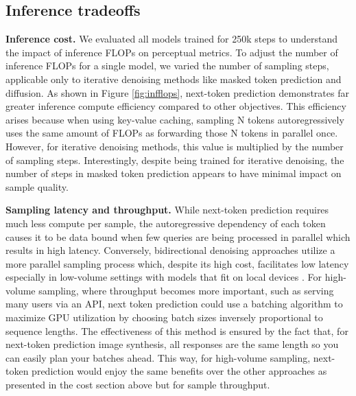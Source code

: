 \mainres
\fintl

\subsection{Inference tradeoffs}
\label{sec:results:inference}
\textbf{Inference cost.} We evaluated all models trained for 250k steps to understand the impact of inference FLOPs on perceptual metrics. To adjust the number of inference FLOPs for a single model, we varied the number of sampling steps, applicable only to iterative denoising methods like masked token prediction and diffusion. As shown in Figure \ref{fig:infflops}, next-token prediction demonstrates far greater inference compute efficiency compared to other objectives. This efficiency arises because when using key-value caching, sampling N tokens autoregressively uses the same amount of FLOPs as forwarding those N tokens in parallel once. However, for iterative denoising methods, this value is multiplied by the number of sampling steps. Interestingly, despite being trained for iterative denoising, the number of steps in masked token prediction appears to have minimal impact on sample quality.

\infflops

\textbf{Sampling latency and throughput.} While next-token prediction requires much less compute per sample, the autoregressive dependency of each token causes it to be data bound when few queries are being processed in parallel which results in high latency. Conversely, bidirectional denoising approaches utilize a more parallel sampling process which, despite its high cost, facilitates low latency especially in low-volume settings with models that fit on local devices \citep{chang2022maskgit}. For high-volume sampling, where throughput becomes more important, such as serving many users via an API, next token prediction could use a batching algorithm to maximize GPU utilization by choosing batch sizes inversely proportional to sequence lengths. The effectiveness of this method is ensured by the fact that, for next-token prediction image synthesis, all responses are the same length so you can easily plan your batches ahead. This way, for high-volume sampling, next-token prediction would enjoy the same benefits over the other approaches as presented in the cost section above but for sample throughput.

